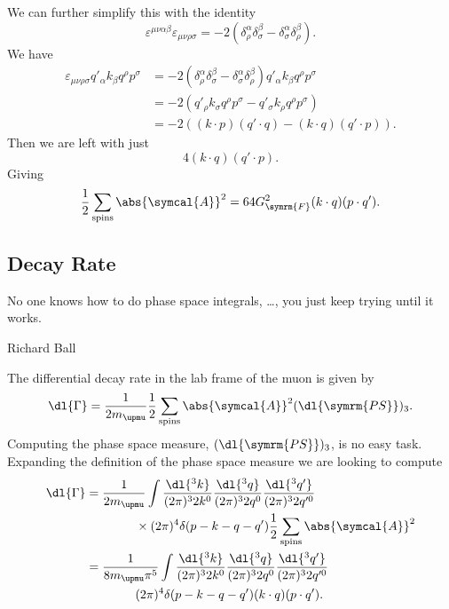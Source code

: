 \documentclass[fleqn]{NotesClass}
\newcommand{\Pmux}{\ensuremath{\upmu}}
\newcommand{\amplitude}{\symcal{A}}
\newcommand{\fermiConst}{G_{\symrm{F}}}
\newcommand{\phaseSpaceMeasure}[1][n]{(\dl{\symrm{PS}})_{#1}}
\begin{document}
    We can further simplify this with the identity
    \begin{equation}
        \varepsilon^{\mu\nu\alpha\beta}\varepsilon_{\mu\nu\rho\sigma} = -2(\delta^\alpha_\rho \delta^\beta_\sigma - \delta^\alpha_\sigma \delta^\beta_\rho).
    \end{equation}
    We have
    \begin{align}
        \varepsilon_{\mu\nu\rho\sigma} q'_\alpha k_\beta q^\rho p^\sigma &= -2(\delta^\alpha_\rho \delta^\beta_\sigma - \delta^\alpha_\sigma \delta^\beta_\rho) q'_\alpha k_\beta q^\rho p^\sigma\\
        &= -2(q'_\rho k_\sigma q^\rho p^\sigma - q'_\sigma k_\rho q^\rho p^\sigma)\\
        &= -2((k \cdot p)(q' \cdot q) - (k \cdot q)(q' \cdot p)).
    \end{align}
    Then we are left with just
    \begin{equation}
        4(k \cdot q)(q' \cdot p).
    \end{equation}
    Giving
    \begin{equation}
        \frac{1}{2}\sum_{\text{spins}} \abs{\amplitude}^2 = 64 \fermiConst^2 (k \cdot q)(p \cdot q').
    \end{equation}
    
    \subsection{Decay Rate}
    \epigraph{No one knows how to do phase space integrals, \ldots, you just keep trying until it works.}{Richard Ball}
    The differential decay rate in the lab frame of the muon is given by
    \begin{equation}
        \dl{\Gamma} = \frac{1}{2m_{\Pmux}} \frac{1}{2}\sum_{\text{spins}} \abs{\amplitude}^2 \phaseSpaceMeasure[3].
    \end{equation}
    Computing the phase space measure, \(\phaseSpaceMeasure[3]\), is no easy task.
    Expanding the definition of the phase space measure we are looking to compute
    \begin{align}
        \dl{\Gamma} &= \frac{1}{2m_{\Pmux}} \int \frac{\dl{^3k}}{(2\pi)^3 2k^0} \frac{\dl{^3q}}{(2\pi)^3 2q^0} \frac{\dl{^3q'}}{(2\pi)^3 2q'^0}\\
        &\qquad\qquad \times (2\pi)^4\delta(p - k - q - q') \frac{1}{2} \sum_{\text{spins}} \abs{\amplitude}^2\\
        &= \frac{1}{8 m_{\Pmux} \pi^5} \int \frac{\dl{^3k}}{(2\pi)^3 2k^0} \frac{\dl{^3q}}{(2\pi)^3 2q^0} \frac{\dl{^3q'}}{(2\pi)^3 2q'^0}\\
        &\qquad\qquad (2\pi)^4\delta(p - k - q - q') (k \cdot q)(p \cdot q').
    \end{align}
    
\end{document}
